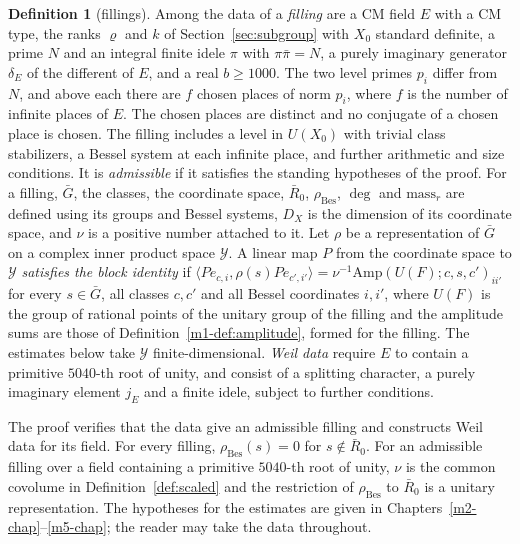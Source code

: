 \documentclass[reqno]{amsart}
\newcounter{chap}
\theoremstyle{definition}
\newtheorem{definition}{Definition}[section]
\theoremstyle{plain}
\theoremstyle{remark}
\newcommand{\Yc}{\mathcal Y}
\newcommand{\Gb}{\bar G}
\newcommand{\Rb}{\bar R_0}
\newcommand{\rB}{\rho_{\mathrm{Bes}}}
\newcommand{\Amp}{\mathrm{Amp}}
\begin{document}
\begin{definition}[fillings]\label{def:filling}
Among the data of a \emph{filling} are a CM field \(E\) with a CM type, the ranks \(\varrho\) and \(k\) of Section~\ref{sec:subgroup} with \(X_0\) standard definite, a prime \(N\) and an integral finite idele \(\pi\) with \(\pi\bar\pi=N\), a purely imaginary generator \(\delta_E\) of the different of \(E\), and a real \(b\ge1000\).  The two level primes \(p_i\) differ from \(N\), and above each there are \(f\) chosen places of norm \(p_i\), where \(f\) is the number of infinite places of \(E\).  The chosen places are distinct and no conjugate of a chosen place is chosen.  The filling includes a level in \(U(X_0)\) with trivial class stabilizers, a Bessel system at each infinite place, and further arithmetic and size conditions.  It is \emph{admissible} if it satisfies the standing hypotheses of the proof.  For a filling, \(\Gb\), the classes, the coordinate space, \(\Rb\), \(\rB\), \(\deg\) and \(\mathrm{mass}_r\) are defined using its groups and Bessel systems, \(D_X\) is the dimension of its coordinate space, and \(\nu\) is a positive number attached to it.  Let \(\rho\) be a representation of \(\Gb\) on a complex inner product space \(\Yc\).  A linear map \(P\) from the coordinate space to \(\Yc\) \emph{satisfies the block identity} if \(\langle Pe_{c,i},\rho(s)Pe_{c',i'}\rangle=\nu^{-1}\Amp(U(F);c,s,c')_{ii'}\) for every \(s\in\Gb\), all classes \(c,c'\) and all Bessel coordinates \(i,i'\), where \(U(F)\) is the group of rational points of the unitary group of the filling and the amplitude sums are those of Definition~\ref{m1-def:amplitude}, formed for the filling.  The estimates below take \(\Yc\) finite-dimensional.  \emph{Weil data} require \(E\) to contain a primitive \(5040\)-th root of unity, and consist of a splitting character, a purely imaginary element \(j_E\) and a finite idele, subject to further conditions.
\end{definition}

The proof verifies that the data give an admissible filling and constructs Weil data for its field.  For every filling, \(\rB(s)=0\) for \(s\notin\Rb\).  For an admissible filling over a field containing a primitive \(5040\)-th root of unity, \(\nu\) is the common covolume in Definition~\ref{def:scaled} and the restriction of \(\rB\) to \(\Rb\) is a unitary representation.  The hypotheses for the estimates are given in Chapters~\ref{m2-chap}--\ref{m5-chap}; the reader may take the data throughout.
\end{document}
